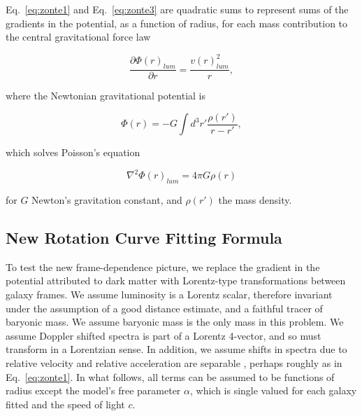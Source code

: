 \documentclass[reprint,%
 amsmath,amssymb,
 aps,
]{revtex4-1}
\begin{document}
    Eq.~\ref{eq:zonte1} and Eq.~\ref{eq:zonte3} are quadratic    sums to represent  sums of the  gradients in the potential,  as a function of  radius, 
 for each mass contribution to the  central gravitational    force law   

\begin{equation}
 \frac{\partial \Phi(r)_{lum}}{\partial r}    =\frac{v(r)_{lum}^2}{r},  
    \label{zoochance1}
\end{equation}

  
   
where the   Newtonian gravitational potential is

\begin{equation}
      \Phi(r)  = -G \int d^3r'  \frac{ \rho(r') }{r-r'} ,
      \label{eq:Newt}
      \end{equation}

which solves Poisson's equation

\begin{equation}
\nabla^2 \Phi(r)_{lum}  = 4\pi G \rho(r)   
    \label{whatsgood}
\end{equation}

 for $G$  Newton's   gravitation constant, and 
$\rho(r')$  the mass density. 
  



\subsection{New Rotation Curve Fitting Formula}

  

 

 To test the   new 
frame-dependence picture, 
we  replace the gradient in the potential   attributed to   dark matter      with  Lorentz-type transformations between galaxy frames.   We    assume  luminosity   is a Lorentz scalar, therefore invariant under the assumption of a good distance estimate, and   a faithful tracer of baryonic mass.  We assume baryonic mass is the only mass in this problem. 
We assume   
   Doppler shifted spectra is part of a Lorentz 4-vector, and so    must transform in a Lorentzian sense.
In addition, we 
   assume   shifts in   spectra   due to relative velocity and relative acceleration are separable \cite{Jack,Cisn}, perhaps roughly  as in Eq.~\ref{eq:zonte1}.
  In what follows, all   terms  can be assumed to  be functions of radius except the model's free parameter $\alpha$,  which is single valued for each galaxy fitted and the speed of light $c$. 
   
\end{document}
